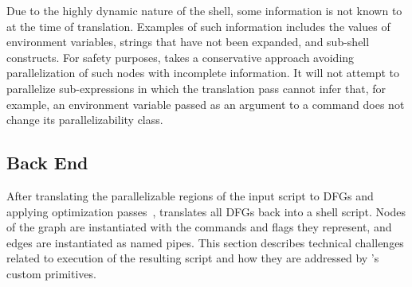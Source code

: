 \documentclass[letterpaper,twocolumn,10pt]{article}
\newcommand{\todo}[1]{\hl{#1}\xspace}
\newcommand{\kk}[1]{[{\color{magenta}kk: #1}]}
\begin{document}
Due to the highly dynamic nature of the shell, some information is not known to \sys at the time of translation.
Examples of such information includes the values of environment variables, strings that have not been expanded, and sub-shell constructs.
For safety purposes, \sys takes a conservative approach avoiding parallelization of such nodes with incomplete information.
It will not attempt to parallelize sub-expressions in which the translation pass cannot infer that, for example, an environment variable passed as an argument to a command does not change its parallelizability class.



\subsection{\sys Back End}
\label{optimizer}


After translating the parallelizable regions of the input script to DFGs and applying optimization passes~,
  \sys translates all DFGs back into a shell script.
Nodes of the graph are instantiated with the commands and flags they represent, and edges are instantiated as named pipes.
This section describes technical challenges related to execution of the resulting script and how they are addressed by \sys's custom primitives.


\end{document}
